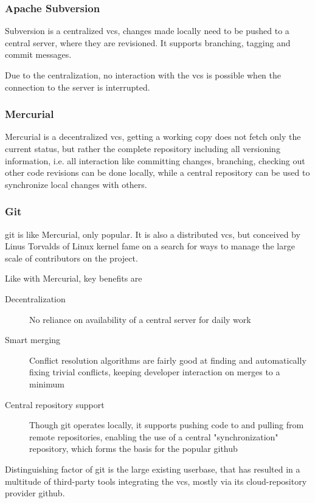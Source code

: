 \subsubsection{Apache Subversion}
Subversion is a centralized \gls{vcs}, changes made locally need to be pushed to a central server, where they are revisioned. It supports branching, tagging and commit messages.

Due to the centralization, no interaction with the \gls{vcs} is possible when the connection to the server is interrupted.

\subsubsection{Mercurial}
Mercurial is a decentralized \gls{vcs}, getting a working copy does not fetch only the current status, but rather the complete repository including all versioning information, i.e. all interaction like committing changes, branching, checking out other code revisions can be done locally, while a central repository can be used to synchronize local changes with others.

\subsubsection{Git}
\gls{git} is like Mercurial, only popular. It is also a distributed \gls{vcs}, but conceived by Linus Torvalds of Linux kernel fame on a search for ways to manage the large scale of contributors on the project.

Like with Mercurial, key benefits are
\begin{description}
	\item[Decentralization] No reliance on availability of a central server for daily work
	\item[Smart merging] Conflict resolution algorithms are fairly good at finding and automatically fixing trivial conflicts, keeping developer interaction on merges to a minimum
	\item[Central repository support] Though git operates locally, it supports pushing code to and pulling from remote repositories, enabling the use of a central "synchronization" repository, which forms the basis for the popular \gls{github} 
\end{description}

Distinguishing factor of \gls{git} is the large existing userbase, that has resulted in a multitude of third-party tools integrating the \gls{vcs}, mostly via its \gls{cloud}-repository provider \gls{github}.

